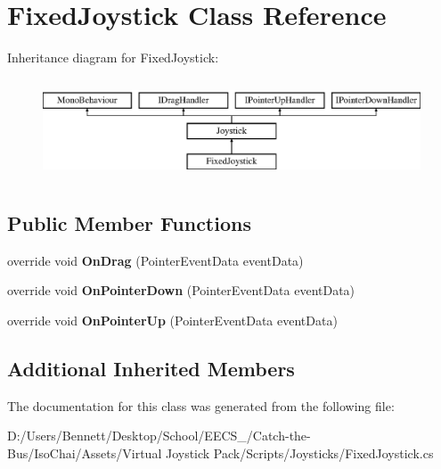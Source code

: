\hypertarget{class_fixed_joystick}{}\section{Fixed\+Joystick Class Reference}
\label{class_fixed_joystick}
Inheritance diagram for Fixed\+Joystick\+:\begin{figure}[H]
\begin{center}
\leavevmode
\includegraphics[height=3.000000cm]{class_fixed_joystick}
\end{center}
\end{figure}
\subsection*{Public Member Functions}
\begin{DoxyCompactItemize}
\item 
\mbox{\label{class_fixed_joystick_a3608a6ae388b2718af9b91155d86eea5}} 
override void {\bfseries On\+Drag} (Pointer\+Event\+Data event\+Data)
\item 
\mbox{\label{class_fixed_joystick_a2e6be1323f094b36b40f820cc326c06f}} 
override void {\bfseries On\+Pointer\+Down} (Pointer\+Event\+Data event\+Data)
\item 
\mbox{\label{class_fixed_joystick_acebb0623f5935bf101b718aacb5b5ac3}} 
override void {\bfseries On\+Pointer\+Up} (Pointer\+Event\+Data event\+Data)
\end{DoxyCompactItemize}
\subsection*{Additional Inherited Members}


The documentation for this class was generated from the following file\+:\begin{DoxyCompactItemize}
\item 
D\+:/\+Users/\+Bennett/\+Desktop/\+School/\+E\+E\+C\+S\+\_/\+Catch-\/the-\/\+Bus/\+Iso\+Chai/\+Assets/\+Virtual Joystick Pack/\+Scripts/\+Joysticks/Fixed\+Joystick.\+cs\end{DoxyCompactItemize}
